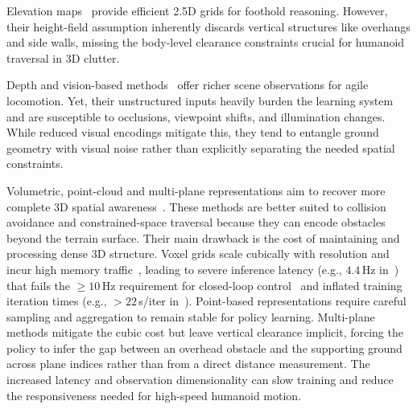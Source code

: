 Elevation maps~\cite{Fankhauser2014RobotCentricElevationMapping,Fankhauser2018ProbabilisticTerrainMapping,long2025learning,wang2025beamdojo,ren2025vb,he2025attention,Zhang_2026_AME2} provide efficient 2.5D grids for foothold reasoning. However, their height-field assumption inherently discards vertical structures like overhangs and side walls, missing the body-level clearance constraints crucial for humanoid traversal in 3D clutter.

Depth and vision-based methods~\cite{zhuang2024humanoidRobot,Li_2024_MOVE,zhuang2024humanoid,Yu_2025_START,Castillo_2025_LearningTerrainAwareBipedalLocomotion,Sun_2025_DPL,Wang_2025_LocoMamba,zhu2026hiking} offer richer scene observations for agile locomotion. Yet, their unstructured inputs heavily burden the learning system and are susceptible to occlusions, viewpoint shifts, and illumination changes. While reduced visual encodings mitigate this, they tend to entangle ground geometry with visual noise rather than explicitly separating the needed spatial constraints.


Volumetric, point-cloud and multi-plane representations aim to recover more complete 3D spatial awareness~\cite{Multi-Layer_ElevationMap_2025,Ben_2025_Gallant,Niijima_2025_Real-timeMulti-PlaneSegmentation,Wang_2025_Omni-Perception,Xue_2026_Collision-FreeHumanoidTraversal}. These methods are better suited to collision avoidance and constrained-space traversal because they can encode obstacles beyond the terrain surface. Their main drawback is the cost of maintaining and processing dense 3D structure. Voxel grids scale cubically with resolution and incur high memory traffic~\cite{2020arXiv200716100T}, leading to severe inference latency (e.g., $4.4$\,Hz in~\cite{2018arXiv181205784L}) that fails the $\ge 10$\,Hz requirement for closed-loop control~\cite{2022arXiv220108117M} and inflated training iteration times (e.g., $>22$\,s/iter in~\cite{Ben_2025_Gallant}). Point-based representations require careful sampling and aggregation to remain stable for policy learning. Multi-plane methods mitigate the cubic cost but leave vertical clearance implicit, forcing the policy to infer the gap between an overhead obstacle and the supporting ground across plane indices rather than from a direct distance measurement. The increased latency and observation dimensionality can slow training and reduce the responsiveness needed for high-speed humanoid motion.

